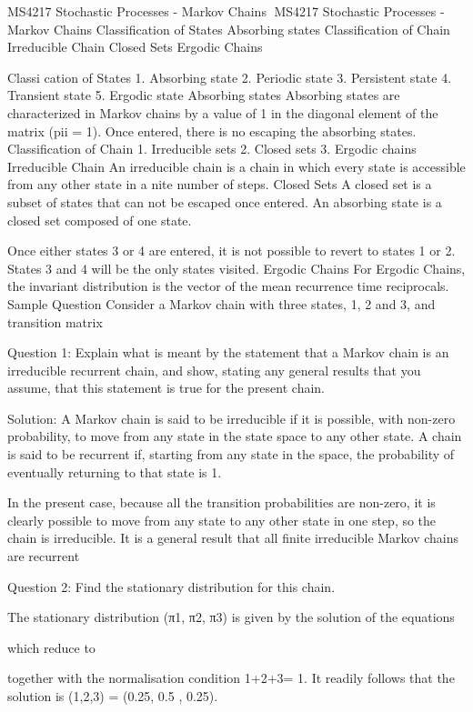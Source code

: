 MS4217 Stochastic Processes - Markov Chains
MS4217 Stochastic Processes - Markov Chains
Classification of States
Absorbing states
Classification of Chain
Irreducible Chain
Closed Sets
Ergodic Chains









Classi cation of States
1. Absorbing state
2. Periodic state
3. Persistent state
4. Transient state
5. Ergodic state
Absorbing states
Absorbing states are characterized in Markov chains by a value of 1 in the diagonal
element of the matrix (pii = 1). Once entered, there is no escaping the absorbing
states.
Classification of Chain
1. Irreducible sets
2. Closed sets
3. Ergodic chains
Irreducible Chain
An irreducible chain is a chain in which every state is accessible from any other state
in a nite number of steps.
Closed Sets
A closed set is a subset of states that can not be escaped once entered. An absorbing
state is a closed set composed of one state.


Once either states 3 or 4 are entered, it is not possible to
revert to states 1 or 2. States 3 and 4 will be the only states
visited.
Ergodic Chains
For Ergodic Chains, the invariant distribution is the vector of
the mean recurrence time reciprocals.
Sample Question
Consider a Markov chain with three states, 1, 2 and 3, and transition matrix 



Question 1: Explain what is meant by the statement that a Markov chain is an irreducible recurrent chain, and show, stating any general results that you assume, that this statement is true for the present chain.
 
Solution: A Markov chain is said to be irreducible if it is possible, with non-zero probability, to move from any state in the state space to any other state. A chain is said to be recurrent if, starting from any state in the space, the probability of eventually returning to that state is 1.

In the present case, because all the transition probabilities are non-zero, it is clearly possible to move from any state to any other state in one step, so the chain is irreducible. It is a general result that all finite irreducible Markov chains are recurrent

Question 2: Find the stationary distribution for this chain.

The stationary distribution (π1, π2, π3) is given by the solution of the equations

	

which reduce to

	

together with the normalisation condition 1+2+3= 1.
It readily follows that the solution is (1,2,3) = (0.25, 0.5 , 0.25).
